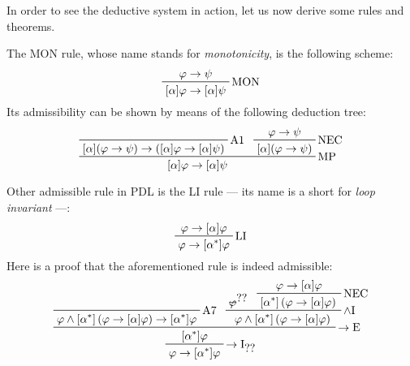 In order to see the deductive system in action, let us now derive some rules and theorems.

\begin{example}
The MON rule, whose name stands for \emph{monotonicity}, is the following scheme:
\begin{displaymath}
\prftree[r]{MON}{\phi \to \psi}{\necess{\alpha}{\phi} \to \necess{\alpha}{\psi}}
\end{displaymath}
%
Its admissibility can be shown by means of the following deduction tree:
%
\begin{displaymath}
\prftree[r]{MP}{
\prfbyaxiom{A1}{
\necess{\alpha}{(\phi \to \psi)} \to (\necess{\alpha}{\phi} \to \necess{\alpha}{\psi})
}
}{
\prftree[r]{NEC}{\phi \to \psi}{
\necess{\alpha}{(\phi \to \psi)}
}
}{
\necess{\alpha}{\phi} \to \necess{\alpha}{\psi}
}
\end{displaymath}
\end{example}

\begin{example}[Admissibility of LI]
Other admissible rule in PDL is the LI rule --- its name is a short for \emph{loop invariant} ---:
%
\begin{displaymath}
\prftree[r]{LI}{\phi \to \necess{\alpha}{\phi}}{
\phi \to \necess{\iter \alpha}{\phi}
}
\end{displaymath}
%
Here is a proof that the aforementioned rule is indeed admissible:
\begin{displaymath}
\prftree[r]{$\to\text{I}_{\prfref<assum:A>}$}{
\prfboundedstyle=1
\prftree[r]{$\to\text{E}$}{
\prfbyaxiom{A7}{\phi \land \necess{\iter \alpha}{\paren{\phi \to \necess{\alpha}{\phi}}} \to \necess{\iter \alpha}{\phi}}
}{
\prftree[r]{$\land\text{I}$}{
\prfboundedassumption<assum:A>{\phi }
}{
\prftree[r]{NEC}{
\prfassumption{\phi \to \necess{\alpha}{\phi}}
}{
\necess{\iter \alpha}{\paren{\phi \to \necess{\alpha}{\phi}}}
}
}{
\phi \land \necess{\iter \alpha}{\paren{\phi \to \necess{\alpha}{\phi}}}
}
}{
\necess{\iter \alpha}{\phi}
}
}{
\phi \to \necess{\iter \alpha}{\phi}
}
\end{displaymath}
\end{example}

